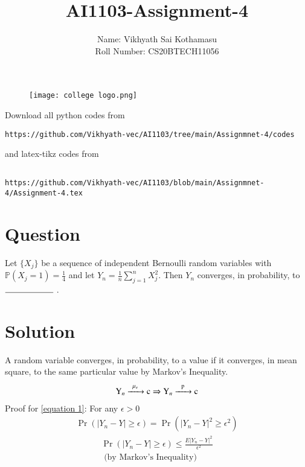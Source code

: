\documentclass[journal,12pt,twocolumn]{IEEEtran}
\begin{document}
\title{AI1103-Assignment-4}
\author{Name: Vikhyath Sai Kothamasu\\Roll Number: CS20BTECH11056}
\maketitle
\newpage
\bigskip
\renewcommand{\thefigure}{\theenumi}
\renewcommand{\thetable}{\theenumi}

\begin{figure} [h]
    \texttt{[image: college logo.png]}
\end{figure}

Download all python codes from 
\begin{lstlisting}
https://github.com/Vikhyath-vec/AI1103/tree/main/Assignmnet-4/codes
\end{lstlisting}
%
and latex-tikz codes from 
%
\begin{lstlisting}

https://github.com/Vikhyath-vec/AI1103/blob/main/Assignmnet-4/Assignment-4.tex
\end{lstlisting}
\section*{Question}
Let $\{X_j\}$ be a sequence of independent Bernoulli random variables with $\mathbb{P}(X_j=1) = \frac{1}{4}$ and let $Y_n = \frac{1}{n} \sum_{j=1}^{n}X_j^2$. Then $Y_n$ converges, in probability, to $\rule{2cm}{0.15mm}$ .

\section*{Solution}
A random variable converges, in probability, to a value if it converges, in mean square, to the same particular value by Markov's Inequality.
\begin{align}
    \ce{Y_n ->[\mu_s] c} \Rightarrow \ce{Y_n ->[p] c} \label{equation 1}
\end{align}
Proof for \eqref{equation 1}: For any $\epsilon > 0$
\begin{align}
    \Pr{(|Y_n-Y|\geq \epsilon)} = \Pr{(|Y_n-Y|^2\geq \epsilon^2)}
\end{align}
\begin{multline}
    \Pr{(|Y_n-Y|\geq \epsilon)}  \leq \frac{E|Y_n-Y|^2}{\epsilon^2} 
    \\\text{ (by Markov's Inequality)}
\end{multline}
 
\end{document}

